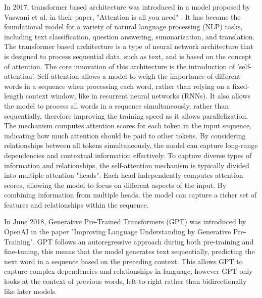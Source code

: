 \documentclass{UoYCSproject}
\begin{document}
    In 2017, transformer based architecture was introduced in a model proposed by Vaswani et al. in their paper, "Attention is all you need" \cite{vaswani2023attention}.
    It has become the foundational model for a variety of natural language processing (NLP) tasks, including text classification, question answering, summarization, and translation.
    The transformer based architecture is a type of neural network architecture that is designed to process sequential data, such as text, and is based on the concept of attention.
    The core innovation of this architecture is the introduction of 'self-attention'.
    Self-attention allows a model to weigh the importance of different words in a sequence when processing each word, rather than relying on a fixed-length context window, like in recurrent neural networks (RNNs).
    It also allows the model to process all words in a sequence simultaneously, rather than sequentially, therefore improving the training speed as it allows parallelization.
    The mechanism computes attention scores for each token in the input sequence, indicating how much attention should be paid to other tokens.
    By considering relationships between all tokens simultaneously, the model can capture long-range dependencies and contextual information effectively.
    To capture diverse types of information and relationships, the self-attention mechanism is typically divided into multiple attention "heads".
    Each head independently computes attention scores, allowing the model to focus on different aspects of the input.
    By combining information from multiple heads, the model can capture a richer set of features and relationships within the sequence.
    \par
    In June 2018, Generative Pre-Trained Transformers (GPT) was introduced by OpenAI in the paper "Improving Language Understanding by Generative Pre-Training".
    GPT follows an autoregressive approach during both pre-training and fine-tuning, this means that the model generates text sequentially, predicting the next word in a sequence based on the preceding context.
    This allows GPT to capture complex dependencies and relationships in language, however GPT only looks at the context of previous words, left-to-right rather than bidirectionally like later models.
\end{document}
